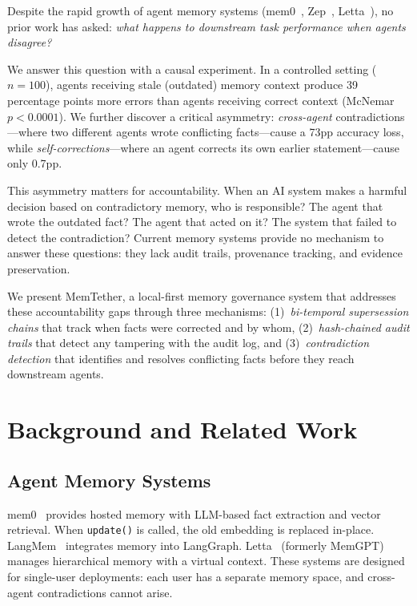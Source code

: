 \documentclass[sigconf]{acmart}
\begin{document}
Despite the rapid growth of agent memory systems (mem0~\cite{mem0}, Zep~\cite{zep}, Letta~\cite{letta}), no prior work has asked: \emph{what happens to downstream task performance when agents disagree?}

We answer this question with a causal experiment. In a controlled setting ($n{=}100$), agents receiving stale (outdated) memory context produce 39 percentage points more errors than agents receiving correct context (McNemar $p < 0.0001$). We further discover a critical asymmetry: \emph{cross-agent} contradictions---where two different agents wrote conflicting facts---cause a 73pp accuracy loss, while \emph{self-corrections}---where an agent corrects its own earlier statement---cause only 0.7pp.

This asymmetry matters for accountability. When an AI system makes a harmful decision based on contradictory memory, who is responsible? The agent that wrote the outdated fact? The agent that acted on it? The system that failed to detect the contradiction? Current memory systems provide no mechanism to answer these questions: they lack audit trails, provenance tracking, and evidence preservation.

We present MemTether, a local-first memory governance system that addresses these accountability gaps through three mechanisms: (1)~\emph{bi-temporal supersession chains} that track when facts were corrected and by whom, (2)~\emph{hash-chained audit trails} that detect any tampering with the audit log, and (3)~\emph{contradiction detection} that identifies and resolves conflicting facts before they reach downstream agents.

\section{Background and Related Work}
\label{sec:related}

\subsection{Agent Memory Systems}

mem0~\cite{mem0} provides hosted memory with LLM-based fact extraction and vector retrieval. When \texttt{update()} is called, the old embedding is replaced in-place. LangMem~\cite{langmem} integrates memory into LangGraph. Letta~\cite{letta} (formerly MemGPT) manages hierarchical memory with a virtual context. These systems are designed for single-user deployments: each user has a separate memory space, and cross-agent contradictions cannot arise.
\end{document}

